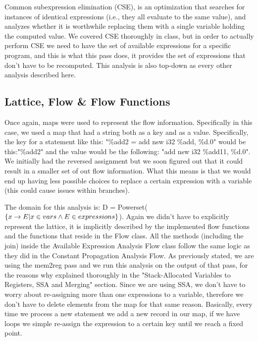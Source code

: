 Common subexpression elimination (CSE), is an optimization that searches for instances of identical expressions (i.e., they all evaluate to the same value), and analyzes whether it is worthwhile replacing them with a single variable holding the computed value. We covered CSE thoroughly in class, but in order to actually perform CSE we need to have the set of available expressions for a specific program, and this is what this pass does, it provides the set of expressions that don't have to be recomputed. This analysis is also top-down as every other analysis described here.


\subsection*{Lattice, Flow \& Flow Functions}

Once again, maps were used to represent the flow information. Specifically in this case, we used a map that had a string both as a key and as a value. Specifically, the key for a statement like this: "\%add2 = add nsw i32 \%add, \%d.0" would be this:"\%add2" and the value would be the following: "add nsw i32 \%add11, \%d.0". We initially had the reversed assignment but we soon figured out that it could result in a smaller set of out flow information. What this means is that we would end up having less possible choices to replace a certain expression with a variable (this could cause issues within branches).

The domain for this analysis is: D = Powerset($\{x\rightarrow E|x\in vars \wedge E\in expressions\}$). Again we didn't have to explicitly represent the lattice, it is implicitly described by the implemented flow functions and the functions that reside in the Flow class. All the methods (including the join) inside the Available Expression Analysis Flow class follow the same logic as they did in the Constant Propagation Analysis Flow. As previously stated, we are using the mem2reg pass and we run this analysis on the output of that pass, for the reasons why explained thoroughly in the "Stack-Allocated Variables to Registers, SSA and Merging" section. Since we are using SSA, we don't have to worry about re-assigning more than one expressions to a variable, therefore we don't have to delete elements from the map for that same reason. Basically, every time we process a new statement we add a new record in our map, if we have loops we simple re-assign the expression to a certain key until we reach a fixed point.




